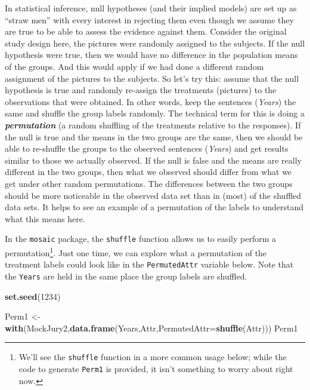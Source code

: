 \documentclass[]{book}
\newenvironment{Shaded}{\begin{snugshade}}{\end{snugshade}}
\newcommand{\KeywordTok}[1]{\textcolor[rgb]{0.13,0.29,0.53}{\textbf{{#1}}}}
\newcommand{\DataTypeTok}[1]{\textcolor[rgb]{0.13,0.29,0.53}{{#1}}}
\newcommand{\DecValTok}[1]{\textcolor[rgb]{0.00,0.00,0.81}{{#1}}}
\newcommand{\StringTok}[1]{\textcolor[rgb]{0.31,0.60,0.02}{{#1}}}
\newcommand{\NormalTok}[1]{{#1}}
\let\rmarkdownfootnote\footnote%
\def\footnote{\protect\rmarkdownfootnote}
\begin{document}
In statistical inference, null hypotheses (and their implied models) are
set up as ``straw men'' with every interest in rejecting them even
though we assume they are true to be able to assess the evidence against
them. Consider the original study design here, the pictures were
randomly assigned to the subjects. If the null hypothesis were true,
then we would have no difference in the population means of the groups.
And this would apply if we had done a different random assignment of the
pictures to the subjects. So let's try this: assume that the null
hypothesis is true and randomly re-assign the treatments (pictures) to
the observations that were obtained. In other words, keep the sentences
(\emph{Years}) the same and shuffle the group labels randomly. The
technical term for this is doing a \textbf{\emph{permutation}} (a random
shuffling of the treatments relative to the responses). If the null is
true and the means in the two groups are the same, then we should be
able to re-shuffle the groups to the observed sentences (\emph{Years})
and get results similar to those we actually observed. If the null is
false and the means are really different in the two groups, then what we
observed should differ from what we get under other random permutations.
The differences between the two groups should be more noticeable in the
observed data set than in (most) of the shuffled data sets. It helps to
see an example of a permutation of the labels to understand what this
means here.

In the \texttt{mosaic} package, the \texttt{shuffle} function allows us
to easily perform a permutation\footnote{We'll see the \texttt{shuffle}
  function in a more common usage below; while the code to generate
  \texttt{Perm1} is provided, it isn't something to worry about right
  now.}. Just one time, we can explore what a permutation of the
treatment labels could look like in the \texttt{PermutedAttr} variable
below. Note that the \texttt{Years} are held in the same place the group
labels are shuffled.

\begin{Shaded}
\begin{Highlighting}[]
\KeywordTok{set.seed}\NormalTok{(}\DecValTok{1234}\NormalTok{)}
\end{Highlighting}
\end{Shaded}

\begin{Shaded}
\begin{Highlighting}[]
\NormalTok{Perm1 <-}\StringTok{ }\KeywordTok{with}\NormalTok{(MockJury2,}\KeywordTok{data.frame}\NormalTok{(Years,Attr,}\DataTypeTok{PermutedAttr=}\KeywordTok{shuffle}\NormalTok{(Attr)))}
\NormalTok{Perm1}
\end{Highlighting}
\end{Shaded}
\end{document}
